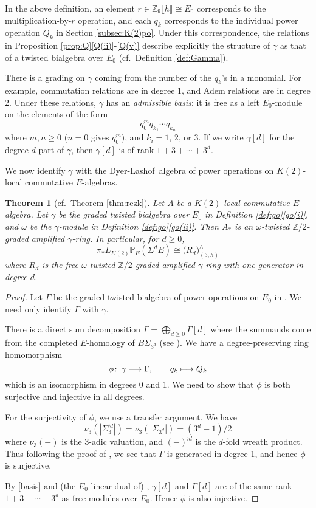 \documentclass{gtpart}
\newtheorem{thm}{Theorem}
\theoremstyle{definition}
\theoremstyle{remark}
\def\co{\colon\thinspace}
\newcommand{\mb}[1]{\mathbb{#1}}
\newcommand{\DL}{Dyer-Lashof~}
\newcommand{\BP}{{\mb P}}
\newcommand{\BZ}{{\mb Z}}
\newcommand{\G}{\Gamma}
\newcommand{\g}{\gamma}
\newcommand{\q}[1]{Proposition \ref{prop:Q}\thinspace \eqref{Q(#1)}}
\newcommand{\go}[1]{Definition \ref{def:go}\thinspace \eqref{go(#1)}}
\numberwithin{equation}{section}
\numberwithin{thm}{section}
\begin{document}
In the above definition, an element 
$r \in \BZ_9 \llbracket h \rrbracket \cong E_0$ corresponds to the 
multiplication-by-$r$ operation, and each $q_k$ corresponds to the 
individual power operation $Q_k$ in Section \ref{subsec:K(2)po}.  Under 
this correspondence, the relations in \q{ii}-\eqref{Q(v)} describe 
explicitly the structure of $\g$ as that of a twisted bialgebra over 
$E_0$ (cf.~Definition \ref{def:Gamma}).  

There is a grading on $\g$ coming from the number of the $q_k$'s in a 
monomial.  For example, commutation relations are in degree 1, and Adem 
relations are in degree 2.  Under these relations, $\g$ has an 
{\em admissible basis}: it is free as a left $E_0$-module on the 
elements of the form 
\begin{equation}
\label{basis}
 q_0^m q_{k_1} \cdots q_{k_n} 
\end{equation}
where $m, n \geq 0$ ($n = 0$ gives $q_0^m$), and $k_i = 1$, 2, or 3.  If 
we write $\g[d]$ for the degree-$d$ part of $\g$, then $\g[d]$ is of 
rank $1 + 3 + \cdots + 3^d$.  

We now identify $\g$ with the \DL algebra of power operations on 
$K(2)$-local commutative $E$-algebras.  

\begin{thm}[cf.~Theorem \ref{thm:rezk}]
\label{thm:gamma}
 Let $A$ be a $K(2)$-local commutative $E$-algebra.  Let $\g$ be the 
 graded twisted bialgebra over $E_0$ in \go{i}, and $\omega$ be the 
 $\g$-module in \go{ii}.  Then $A_*$ is an $\omega$-twisted 
 $\BZ/2$-graded amplified $\g$-ring.  In particular, for $d \geq 0$, 
 \[
  \pi_* L_{K(2)} \BP_E (\Sigma^d E) \cong \big( R_d \big)_{(3,h)}^\wedge 
 \]
 where $R_d$ is the free $\omega$-twisted $\BZ/2$-graded amplified 
 $\g$-ring with one generator in degree $d$.  
\end{thm}
\begin{proof}
 Let $\G$ be the graded twisted bialgebra of power operations on $E_0$ 
 in \cite[Section 6]{cong}.  We need only identify $\G$ with $\g$.  

 There is a direct sum decomposition $\G = \bigoplus_{d \geq 0} \G[d]$ 
 where the summands come from the completed $E$-homology of 
 $B\Sigma_{3^d}$ (see \cite[6.2]{cong}).  
 We have a degree-preserving ring homomorphism 
 \[
  \phi \co \g \longrightarrow \G, \qquad q_k \longmapsto Q_k 
 \]
 which is an isomorphism in degrees 0 and 1.  We need to show that 
 $\phi$ is both surjective and injective in all degrees.  

 For the surjectivity of $\phi$, we use a transfer argument.  We have 
 \[
  \nu_3(|\Sigma_3^{\wr d}|) = \nu_3(|\Sigma_{3^d}|) = (3^d - 1) / 2 
 \]
 where $\nu_3(-)$ is the 3-adic valuation, and $(-)^{\wr d}$ is the 
 $d$-fold wreath product.  Thus following the proof of 
 \cite[Proposition 3.17]{cong}, we see that $\G$ is generated in degree 
 1, and hence $\phi$ is surjective.  

 By \eqref{basis} and (the $E_0$-linear dual of) 
 \cite[Theorem 1.1]{Str98}, $\g[d]$ and $\G[d]$ are of the same rank 
 $1 + 3 + \cdots + 3^d$ as free modules over $E_0$.  Hence $\phi$ is 
 also injective.  
\end{proof}
\end{document}
